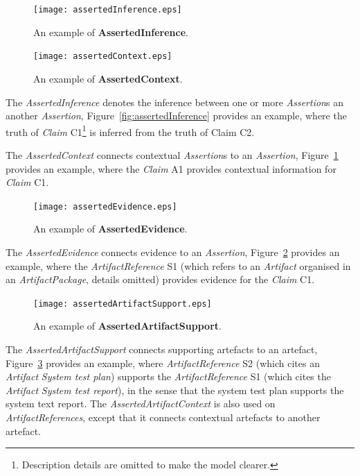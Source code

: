 \begin{figure}
	\centering
	\begin{minipage}[b]{0.49\textwidth}
		\texttt{[image: assertedInference.eps]}
		\caption{An example of \textbf{AssertedInference}.}
		\label{fig:assertedInference}
	\end{minipage}
	\hfill
	\begin{minipage}[b]{0.49\textwidth}
		\texttt{[image: assertedContext.eps]}
		\caption{An example of \textbf{AssertedContext}.}
		\label{fig:assertedContext}
	\end{minipage}
\end{figure}

The \textit{AssertedInference} denotes the inference between one or more \textit{Assertion}s an another \textit{Assertion}, Figure~\ref{fig:assertedInference} provides an example, where the truth of \textit{Claim} C1\footnote{Description details are omitted to make the model clearer.} is inferred from the truth of Claim C2. 

The \textit{AssertedContext} connects contextual \textit{Assertion}s to an \textit{Assertion}, Figure~\ref{fig:assertedContext} provides an example, where the \textit{Claim} A1 provides contextual information for \textit{Claim} C1.

\begin{figure}
	\centering
	\texttt{[image: assertedEvidence.eps]}
	\caption{An example of \textbf{AssertedEvidence}.}
	\label{fig:assertedEvidence}
\end{figure}

The \textit{AssertedEvidence} connects evidence to an \textit{Assertion}, Figure~\ref{fig:assertedEvidence} provides an example, where the \textit{ArtifactReference} S1 (which refers to an \textit{Artifact} organised in an \textit{ArtifactPackage}, details omitted) provides evidence for the \textit{Claim} C1.

\begin{figure}
	\centering
	\texttt{[image: assertedArtifactSupport.eps]}
	\caption{An example of \textbf{AssertedArtifactSupport}.}
	\label{fig:assertedArtifactSupport}
\end{figure}

The \textit{AssertedArtifactSupport} connects supporting artefacts to an artefact, Figure~\ref{fig:assertedArtifactSupport} provides an example, where \textit{ArtifactReference} S2 (which cites an \textit{Artifact} \textit{System test plan}) supports the \textit{ArtifactReference} S1 (which cites the \textit{Artifact} \textit{System test report}), in the sense that the system test plan supports the system text report. 
The \textit{AssertedArtifactContext} is also used on \textit{ArtifactReferences}, except that it connects contextual artefacts to another artefact.

